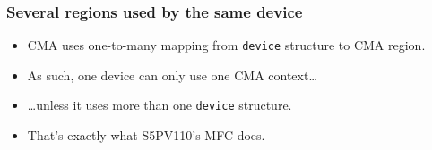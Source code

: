 \begin{frame}
  \frametitle{Several regions used by the same device}

  \begin{itemize}
  \item CMA uses one-to-many mapping from \lstinline|device| structure
    to CMA region.
  \item As such, one device can only use one CMA context\ldots
  \item \ldots unless it uses more than one \lstinline|device|
    structure.
  \item That's exactly what S5PV110's MFC does.
  \end{itemize}
\end{frame}
